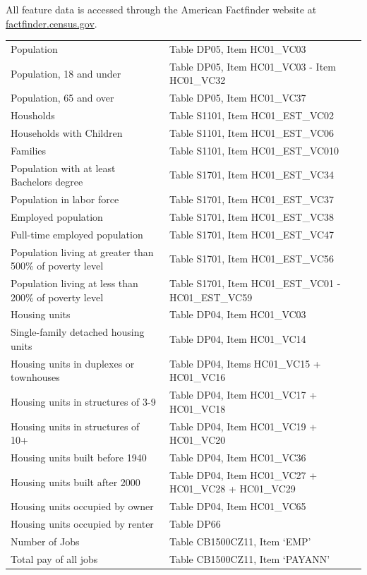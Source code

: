 \documentclass[11pt]{article}
\begin{document}
\begin{appendices}
All feature data is accessed through the American Factfinder website at \url{factfinder.census.gov}.

\begingroup
\fontsize{9}{9}\selectfont
\begin{tabular}{ll}
Population&Table DP05, Item HC01\_VC03\\
Population, 18 and under&Table DP05, Item HC01\_VC03 - Item HC01\_VC32\\
Population, 65 and over&Table DP05, Item HC01\_VC37\\
Housholds&Table S1101, Item HC01\_EST\_VC02\\
Households with Children&Table S1101, Item HC01\_EST\_VC06\\
Families&Table S1101, Item HC01\_EST\_VC010\\
Population with at least Bachelors degree&Table S1701, Item HC01\_EST\_VC34\\
Population in labor force&Table S1701, Item HC01\_EST\_VC37\\
Employed population&Table S1701, Item HC01\_EST\_VC38\\
Full-time employed population&Table S1701, Item HC01\_EST\_VC47\\
Population living at greater than 500\% of poverty level&Table S1701, Item HC01\_EST\_VC56\\
Population living at less than 200\% of poverty level&Table S1701, Item HC01\_EST\_VC01 -  HC01\_EST\_VC59\\
Housing units&Table DP04, Item HC01\_VC03\\
Single-family detached housing units&Table DP04, Item HC01\_VC14\\
Housing units in duplexes or townhouses&Table DP04, Items HC01\_VC15 + HC01\_VC16\\
Housing units in structures of 3-9&Table DP04, Item HC01\_VC17 + HC01\_VC18\\
Housing units in structures of 10+&Table DP04, Item HC01\_VC19 + HC01\_VC20\\
Housing units built before 1940&Table DP04, Item HC01\_VC36\\
Housing units built after 2000&Table DP04, Item HC01\_VC27 + HC01\_VC28 + HC01\_VC29\\
Housing units occupied by owner&Table DP04, Item HC01\_VC65\\
Housing units occupied by renter&Table DP66\\
Number of Jobs&Table CB1500CZ11, Item ‘EMP’\\
Total pay of all jobs&Table CB1500CZ11, Item ‘PAYANN’\\

\end{tabular}
\end{appendices}
\end{document}
